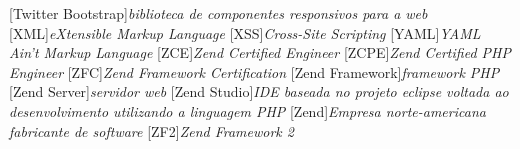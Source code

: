 [Twitter Bootstrap]{\textit{biblioteca de
componentes responsivos para a web}}
			[XML]{\textit{eXtensible Markup Language}}
			[XSS]{\textit{Cross-Site Scripting}}
			[YAML]{\textit{YAML Ain't Markup Language}}
			[ZCE]{\textit{Zend Certified Engineer}}
			[ZCPE]{\textit{Zend Certified PHP Engineer}}
			[ZFC]{\textit{Zend Framework Certification}}
[Zend Framework]{\textit{framework PHP}}
	[Zend Server]{\textit{servidor web}}
	[Zend Studio]{\textit{IDE baseada no projeto eclipse voltada
ao desenvolvimento utilizando a linguagem PHP}}
			[Zend]{\textit{Empresa norte-americana fabricante de software}}
			[ZF2]{\textit{Zend Framework 2}}